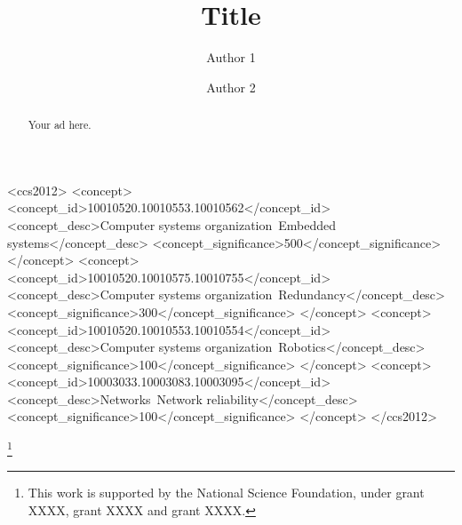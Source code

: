 \documentclass[acmtog,authorversion]{acmart}
\begin{document}
\title{Title} 
\author{Author 1}
\author{Author 2}

\renewcommand\shortauthors{Author1 and Author2}

\begin{abstract}
   Your ad here.
\end{abstract}


%
%
\begin{CCSXML}
<ccs2012>
 <concept>
  <concept_id>10010520.10010553.10010562</concept_id>
  <concept_desc>Computer systems organization~Embedded systems</concept_desc>
  <concept_significance>500</concept_significance>
 </concept>
 <concept>
  <concept_id>10010520.10010575.10010755</concept_id>
  <concept_desc>Computer systems organization~Redundancy</concept_desc>
  <concept_significance>300</concept_significance>
 </concept>
 <concept>
  <concept_id>10010520.10010553.10010554</concept_id>
  <concept_desc>Computer systems organization~Robotics</concept_desc>
  <concept_significance>100</concept_significance>
 </concept>
 <concept>
  <concept_id>10003033.10003083.10003095</concept_id>
  <concept_desc>Networks~Network reliability</concept_desc>
  <concept_significance>100</concept_significance>
 </concept>
</ccs2012>  
\end{CCSXML}


%
%




\thanks{This work is supported by the National Science Foundation, under grant XXXX, grant XXXX and grant XXXX.}

\end{document}
